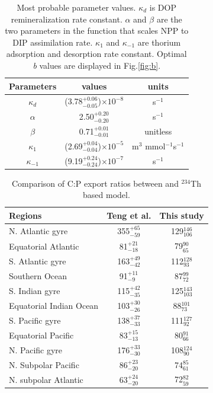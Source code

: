 \clearpage
\begin{table}
\centering
\caption{Most probable parameter values. $\kappa_d$ is DOP remineralization rate constant. $\alpha$ and $\beta$ are the two parameters in the function that scales NPP to DIP assimilation rate. $\kappa_1$ and $\kappa_{-1}$ are thorium adsorption and desorption rate constant. Optimal \textit{b} values are displayed in Fig.\ref{fig:b}.}\label{tab:parameters}
    \begin{tabular}{c c c}
    \hline\hline
    Parameters & values & units\\
    \hline
    $\kappa_d $  &(3.78$^{+0.06}_{-0.05}$)$\times 10^{-8} $& s$^{-1}$\\
    $\alpha $    &2.50$^{+0.20}_{-0.20}$ & s$^{-1}$\\
    $\beta $     &0.71$^{+0.01}_{-0.01}$                   & unitless\\
    $\kappa_1 $  &(2.69$^{+0.04}_{-0.04}$)$\times 10^{-5} $&
    m$^{3}$ mmol$^{-1}$s$^{-1}$\\
    $\kappa_{-1}$&(9.19$^{+0.24}_{-0.24}$)$\times 10^{-7}$& s$^{-1}$\\
    \hline\hline
    \end{tabular}
\end{table}

\clearpage
\begin{table}
\centering
\caption{Comparison of C:P export ratios between \cite{Teng2014} and $^{234}$Th based model.}\label{tab:C2P}
    \begin{tabular}{l c c}
    \hline\hline
    Regions & Teng et al. & This study\\
    \hline
    N. Atlantic gyre     &355$^{+65}_{-59}$ &129$^{146}_{106}$ \\
    Equatorial Atlantic  &81$^{+21}_{-18}$  &79$^{90}_{65}$ \\
    S. Atlantic gyre     &163$^{+49}_{-42}$ &112$^{128}_{93}$ \\
    Southern Ocean       &91$^{+11}_{-9}$   &87$^{99}_{72}$ \\
    S. Indian gyre       &115$^{+42}_{-35}$ &125$^{143}_{103}$ \\
    Equatorial Indian Ocean &103$^{+30}_{-26}$ &88$^{101}_{73}$ \\
    S. Pacific gyre      &138$^{+37}_{-33}$ &111$^{127}_{92}$ \\
    Equatorial Pacific   &83$^{+15}_{-13}$  &80$^{91}_{66}$ \\
    N. Pacific gyre      &176$^{+33}_{-30}$ &108$^{124}_{90}$ \\
    N. Subpolar Pacific  &86$^{+23}_{-20}$  &74$^{85}_{61}$ \\
    N. subpolar Atlantic &63$^{+24}_{-20}$  &72$^{82}_{59}$\\
    \hline\hline
    \end{tabular}
\end{table}

